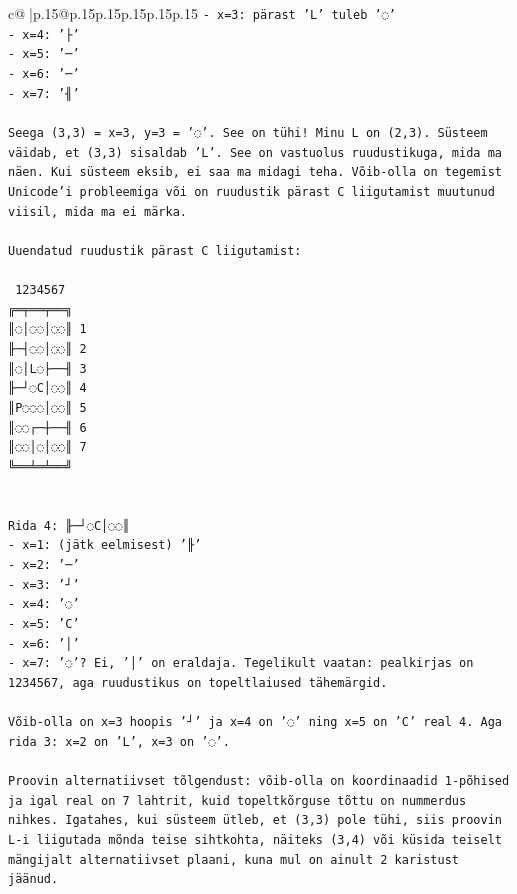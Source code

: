 \documentclass{article}
\begin{document}
{\begin{supertabular}{c@{$\;$}|p{.15\linewidth}@{}p{.15\linewidth}p{.15\linewidth}p{.15\linewidth}p{.15\linewidth}p{.15\linewidth}}
{{{\texttt{{-} x=3: pärast 'L' tuleb '◌'} \\
\texttt{{-} x=4: '├'} \\
\texttt{{-} x=5: '─'} \\
\texttt{{-} x=6: '─'} \\
\texttt{{-} x=7: '╢'} \\
\\ 
\texttt{Seega (3,3) = x=3, y=3 = '◌'. See on tühi! Minu L on (2,3). Süsteem väidab, et (3,3) sisaldab 'L'. See on vastuolus ruudustikuga, mida ma näen. Kui süsteem eksib, ei saa ma midagi teha. Võib{-}olla on tegemist Unicode'i probleemiga või on ruudustik pärast C liigutamist muutunud viisil, mida ma ei märka.} \\
\\ 
\texttt{Uuendatud ruudustik pärast C liigutamist:} \\
\\ 
\texttt{ 1234567} \\
\texttt{╔═╤══╤══╗} \\
\texttt{║◌│◌◌│◌◌║ 1} \\
\texttt{╟─┤◌◌│◌◌║ 2} \\
\texttt{║◌│L◌├──╢ 3} \\
\texttt{╟─┘◌C│◌◌║ 4} \\
\texttt{║P◌◌◌│◌◌║ 5} \\
\texttt{║◌◌┌─┼──╢ 6} \\
\texttt{║◌◌│◌│◌◌║ 7} \\
\texttt{╚══╧═╧══╝} \\
\\ 
\\ 
\texttt{Rida 4: ╟─┘◌C│◌◌║} \\
\texttt{{-} x=1: (jätk eelmisest) '╟'} \\
\texttt{{-} x=2: '─'} \\
\texttt{{-} x=3: '┘'} \\
\texttt{{-} x=4: '◌'} \\
\texttt{{-} x=5: 'C'} \\
\texttt{{-} x=6: '│'} \\
\texttt{{-} x=7: '◌'? Ei, '│' on eraldaja. Tegelikult vaatan: pealkirjas on 1234567, aga ruudustikus on topeltlaiused tähemärgid.} \\
\\ 
\texttt{Võib{-}olla on x=3 hoopis '┘' ja x=4 on '◌' ning x=5 on 'C' real 4. Aga rida 3: x=2 on 'L', x=3 on '◌'.} \\
\\ 
\texttt{Proovin alternatiivset tõlgendust: võib{-}olla on koordinaadid 1{-}põhised ja igal real on 7 lahtrit, kuid topeltkõrguse tõttu on nummerdus nihkes. Igatahes, kui süsteem ütleb, et (3,3) pole tühi, siis proovin L{-}i liigutada mõnda teise sihtkohta, näiteks (3,4) või küsida teiselt mängijalt alternatiivset plaani, kuna mul on ainult 2 karistust jäänud.} \\
}}}
\end{supertabular}}
\end{document}
